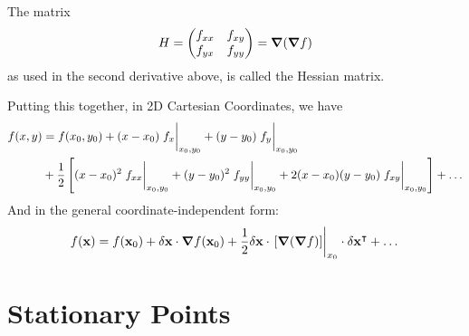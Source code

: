 \documentclass{article}
\begin{document}
The matrix
\[ H = \begin{pmatrix}
		f_{xx} & f_{xy} \\
		f_{yx} & f_{yy}
	\end{pmatrix} = \grad(\grad f) \]
as used in the second derivative above, is called the Hessian matrix.

Putting this together, in 2D Cartesian Coordinates, we have
\begin{align*}
	f(x, y) & = f(x_0, y_0) + (x-x_0)\eval{f_x}_{x_0, y_0} + (y-y_0)\eval{f_y}_{x_0, y_0} \\&+ \frac{1}{2}\left[ (x-x_0)^2\eval{f_{xx}}_{x_0, y_0} + (y-y_0)^2\eval{f_{yy}}_{x_0, y_0} + 2(x-x_0)(y-y_0)\eval{f_{xy}}_{x_0, y_0} \right] + \dots
\end{align*}
And in the general coordinate-independent form:
\[ f(\vb x) = f(\vb x_0) + \delta \vb x \cdot \grad f(\vb x_0) + \frac{1}{2}\delta \vb x \cdot \eval{[\grad (\grad f)]}_{x_0} \cdot \delta \vb x^\transpose + \dots \]

\section{Stationary Points}
\end{document}
